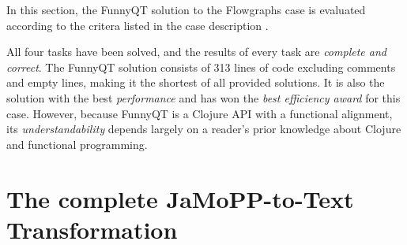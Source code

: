 \documentclass[submission]{eptcs}
\begin{document}
In this section, the FunnyQT solution to the Flowgraphs case is evaluated
according to the critera listed in the case description
\cite{flowgraphcasedesc}.

All four tasks have been solved, and the results of every task are
\emph{complete and correct}.  The FunnyQT solution consists of 313 lines of
code excluding comments and empty lines, making it the shortest of all provided
solutions.  It is also the solution with the best \emph{performance} and has
won the \emph{best efficiency award} for this case.  However, because FunnyQT
is a Clojure API with a functional alignment, its \emph{understandability}
depends largely on a reader's prior knowledge about Clojure and functional
programming.






\appendix
\newpage
\section{The complete JaMoPP-to-Text Transformation}
\label{sec:complete-jamopp-text}
\end{document}
